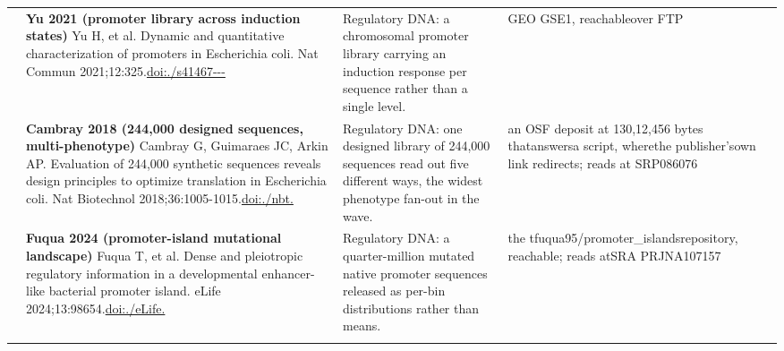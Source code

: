 \begin{landscape}
\begin{longtable}{@{}r@{\hspace{4pt}} L{78mm} L{72mm} L{76mm}@{}}
 & \textbf{Yu 2021 (promoter library across induction states)} \newline Yu H, et al. Dynamic and quantitative characterization of promoters in Escherichia coli. Nat Commun 2021;12:325.\newline \href{https://doi.org/10.1038/s41467-020-20094-3}{doi:./\allowbreak s41467---} & Regulatory DNA: a chromosomal promoter library carrying an induction response per sequence rather than a single level. & GEO GSE1, r\allowbreak eachable\allowbreak  over FT\allowbreak P \\
 & \textbf{Cambray 2018 (244,000 designed sequences, multi-phenotype)} \newline Cambray G, Guimaraes JC, Arkin AP. Evaluation of 244,000 synthetic sequences reveals design principles to optimize translation in Escherichia coli. Nat Biotechnol 2018;36:1005-1015.\newline \href{https://doi.org/10.1038/nbt.4238}{doi:./\allowbreak nbt.} & Regulatory DNA: one designed library of 244,000 sequences read out five different ways, the widest phenotype fan-out in the wave. & an OSF d\allowbreak eposit a\allowbreak t 130,12,456 by\allowbreak tes that\allowbreak  answers\allowbreak  a scrip\allowbreak t, where\allowbreak  the pub\allowbreak lisher's\allowbreak  own lin\allowbreak k redire\allowbreak cts; rea\allowbreak ds at SR\allowbreak P086076 \\
 & \textbf{Fuqua 2024 (promoter-island mutational landscape)} \newline Fuqua T, et al. Dense and pleiotropic regulatory information in a developmental enhancer-like bacterial promoter island. eLife 2024;13:98654.\newline \href{https://doi.org/10.7554/eLife.98654}{doi:./\allowbreak eLife.} & Regulatory DNA: a quarter-million mutated native promoter sequences released as per-bin distributions rather than means. & the tfuq\allowbreak ua95/\allowbreak promote\allowbreak r\_\allowbreak islands\allowbreak  reposit\allowbreak ory, rea\allowbreak chable; \allowbreak reads at\allowbreak  SRA PRJ\allowbreak NA107157 \\
\addlinespace[5pt]

\end{longtable}
\end{landscape}
